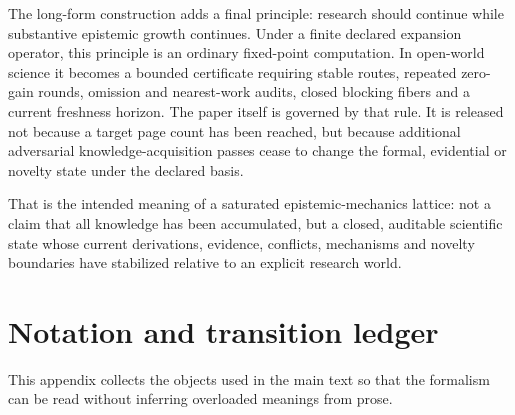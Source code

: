 \documentclass[11pt]{article}
\begin{document}
The long-form construction adds a final principle: research should continue while substantive epistemic growth continues. Under a finite declared expansion operator, this principle is an ordinary fixed-point computation. In open-world science it becomes a bounded certificate requiring stable routes, repeated zero-gain rounds, omission and nearest-work audits, closed blocking fibers and a current freshness horizon. The paper itself is governed by that rule. It is released not because a target page count has been reached, but because additional adversarial knowledge-acquisition passes cease to change the formal, evidential or novelty state under the declared basis.

That is the intended meaning of a saturated epistemic-mechanics lattice: not a claim that all knowledge has been accumulated, but a closed, auditable scientific state whose current derivations, evidence, conflicts, mechanisms and novelty boundaries have stabilized relative to an explicit research world.

\appendix

\section{Notation and transition ledger}

This appendix collects the objects used in the main text so that the formalism can be read without inferring overloaded meanings from prose.
\end{document}
